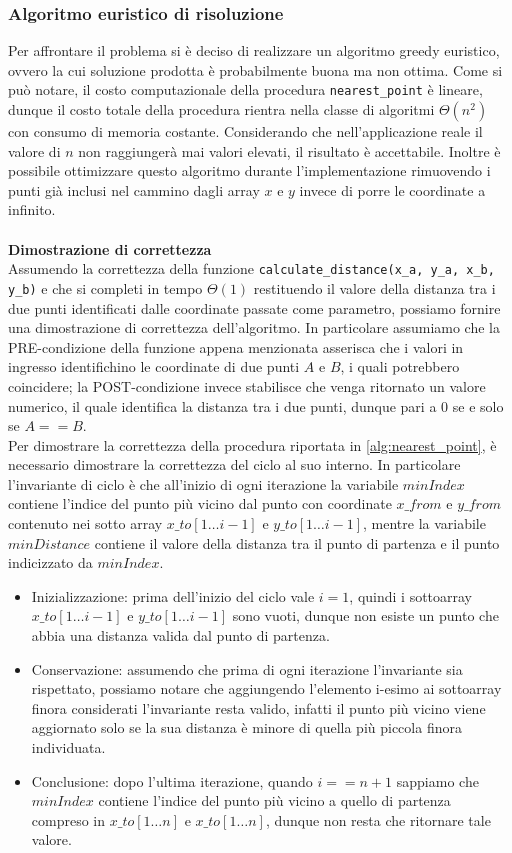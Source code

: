 \subsubsection{Algoritmo euristico di risoluzione}
Per affrontare il problema si è deciso di realizzare un algoritmo greedy euristico, ovvero la cui soluzione prodotta è probabilmente buona ma non ottima.
Come si può notare, il costo computazionale della procedura \verb|nearest_point| è lineare, dunque il costo totale della procedura rientra nella classe di algoritmi $\Theta(n^2)$ con consumo di memoria costante. Considerando che nell'applicazione reale il valore di $n$ non raggiungerà mai valori elevati, il risultato è accettabile. Inoltre è possibile ottimizzare questo algoritmo durante l'implementazione rimuovendo i punti già inclusi nel cammino dagli array $x$ e $y$ invece di porre le coordinate a infinito.\\\\
\textbf{Dimostrazione di correttezza}\\
Assumendo la correttezza della funzione \verb|calculate_distance(x_a, y_a, x_b, y_b)| e che si completi in tempo $\Theta(1)$ restituendo il valore della distanza tra i due punti identificati dalle coordinate passate come parametro, possiamo fornire una dimostrazione di correttezza dell'algoritmo. In particolare assumiamo che la PRE-condizione della funzione appena menzionata asserisca che i valori in ingresso identifichino le coordinate di due punti $A$ e $B$, i quali potrebbero coincidere; la POST-condizione invece stabilisce che venga ritornato un valore numerico, il quale identifica la distanza tra i due punti, dunque pari a $0$ se e solo se $A == B$.\\
Per dimostrare la correttezza della procedura riportata in \ref{alg:nearest_point}, è necessario dimostrare la correttezza del ciclo al suo interno. In particolare l'invariante di ciclo è che all'inizio di ogni iterazione la variabile $minIndex$ contiene l'indice del punto più vicino dal punto con coordinate $x\_from$ e $y\_from$ contenuto nei sotto array $x\_to[1 \dotso i-1]$ e $y\_to[1 \dotso i-1]$, mentre la variabile $minDistance$ contiene il valore della distanza tra il punto di partenza e il punto indicizzato da $minIndex$.

\begin{itemize}
    \item Inizializzazione: prima dell'inizio del ciclo vale $i=1$, quindi i sottoarray $x\_to[1 \dotso i-1]$ e $y\_to[1 \dotso i-1]$ sono vuoti, dunque non esiste un punto che abbia una distanza valida dal punto di partenza.
    \item Conservazione: assumendo che prima di ogni iterazione l'invariante sia rispettato, possiamo notare che aggiungendo l'elemento i-esimo ai sottoarray finora considerati l'invariante resta valido, infatti il punto più vicino viene aggiornato solo se la sua distanza è minore di quella più piccola finora individuata.
    \item Conclusione: dopo l'ultima iterazione, quando $i == n+1$ sappiamo che $minIndex$ contiene l'indice del punto più vicino a quello di partenza compreso in $x\_to[1 \dotso n]$ e $x\_to[1 \dotso n]$, dunque non resta che ritornare tale valore.
\end{itemize}


